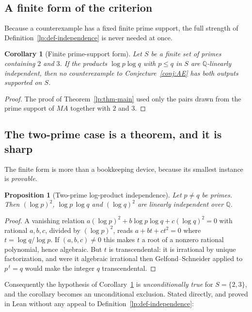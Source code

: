 \documentclass[11pt,oneside]{article}
\newtheorem{proposition}[theorem]{Proposition}
\newtheorem{corollary}[theorem]{Corollary}
\theoremstyle{definition}
\theoremstyle{remark}
\newcommand{\Q}{\mathbb Q}
\begin{document}
\subsection{A finite form of the criterion}

Because a counterexample has a fixed finite prime support, the full strength of
Definition~\ref{lp:def-independence} is never needed at once.

\begin{corollary}[Finite prime-support form]
\label{lp:cor-finite}
Let $S$ be a finite set of primes containing $2$ and $3$.  If the products $\log p\log q$ with
$p\le q$ in $S$ are $\Q$-linearly independent, then no counterexample to
Conjecture~\ref{conj:AE} has both outputs supported on $S$.
\end{corollary}

\begin{proof}
The proof of Theorem~\ref{lp:thm-main} used only the pairs drawn from the prime support of
$MA$ together with $2$ and $3$.
\end{proof}

\subsection{The two-prime case is a theorem, and it is sharp}
\label{lp:twoprime}

The finite form is more than a bookkeeping device, because its smallest instance is
\emph{provable}.

\begin{proposition}[Two-prime log-product independence]
\label{lp:prop-twoprime}
Let $p\neq q$ be primes.  Then $(\log p)^2$, $\log p\,\log q$ and $(\log q)^2$ are linearly
independent over $\Q$.
\end{proposition}

\begin{proof}
A vanishing relation $a(\log p)^2+b\log p\log q+c(\log q)^2=0$ with rational $a,b,c$, divided
by $(\log p)^2$, reads $a+bt+ct^2=0$ where $t=\log q/\log p$.  If $(a,b,c)\neq0$ this makes
$t$ a root of a nonzero rational polynomial, hence algebraic.  But $t$ is transcendental:
it is irrational by unique factorization, and were it algebraic irrational then
Gelfond--Schneider applied to $p^{\,t}=q$ would make the integer $q$ transcendental.
\end{proof}

Consequently the hypothesis of Corollary~\ref{lp:cor-finite} is \emph{unconditionally true}
for $S=\{2,3\}$, and the corollary becomes an unconditional exclusion.  Stated directly, and
proved in Lean without any appeal to Definition~\ref{lp:def-independence}:
\end{document}
